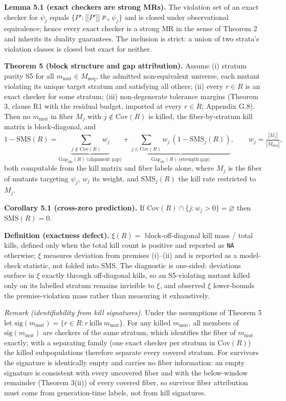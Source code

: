 \documentclass[manuscript,screen,review]{acmart}
\begin{document}
\textbf{Lemma 5.1 (exact checkers are strong MRs).} The violation set of
an exact checker for $\psi_j$ equals
$\{P' : \mathopen{\lbrack\!\lbrack} P' \mathclose{\rbrack\!\rbrack}\not\models_{\tau}\psi_j\}$
and is closed under observational equivalence; hence every exact checker
is a strong MR in the sense of Theorem 2 and inherits its duality
guarantees. The inclusion is strict: a union of two strata's violation
classes is closed but exact for neither.

\textbf{Theorem 5 (block structure and gap attribution).} Assume (i)
stratum purity S5 for all $m_{\mathrm{mut}}\in M_{\mathrm{neq}}$, the
admitted non-equivalent universe, each mutant violating its unique
target stratum and satisfying all others; (ii) every $r\in R$ is an
exact checker for some stratum; (iii) non-degenerate tolerance margins
(Theorem 3, clause R1 with the residual budget, imported at every
$r\in R$; Appendix G.8). Then no $m_{\mathrm{mut}}$ in fiber $M_j$ with
$j\notin \mathrm{Cov}(R)$ is killed, the fiber-by-stratum kill matrix is
block-diagonal, and
\[ 1-\mathrm{SMS}(R)=\underbrace{\textstyle\sum_{j\notin \mathrm{Cov}(R)} w_j}_{\mathrm{Gap}_{\mathrm{aln}}(R)\ \text{(alignment gap)}}
 +\underbrace{\textstyle\sum_{j\in \mathrm{Cov}(R)} w_j\,(1-\mathrm{SMS}_j(R))}_{\mathrm{Gap}_{\mathrm{str}}(R)\ \text{(strength gap)}},
 \qquad w_j=\tfrac{|M_j|}{|M_{\mathrm{neq}}|}, \]
both computable from the kill matrix and fiber labels alone, where
$M_j$ is the fiber of mutants targeting $\psi_j$, $w_j$ its weight, and
$\mathrm{SMS}_j(R)$ the kill rate restricted to $M_j$.

\textbf{Corollary 5.1 (cross-zero prediction).} If
$\mathrm{Cov}(R)\cap\{j:w_j>0\}=\varnothing$ then $\mathrm{SMS}(R)=0$.

\textbf{Definition (exactness defect).} $\xi(R)=$ block-off-diagonal
kill mass / total kills, defined only when the total kill count is
positive and reported as \texttt{NA} otherwise; $\xi$ measures deviation
from premises (i)--(ii) and is reported as a model-check statistic, not
folded into SMS. The diagnostic is one-sided: deviations surface in
$\xi$ exactly through off-diagonal kills, so an S5-violating mutant
killed only on its labelled stratum remains invisible to $\xi$, and
observed $\xi$ lower-bounds the premise-violation mass rather than
measuring it exhaustively.

\emph{Remark (identifiability from kill signatures).} Under the
assumptions of Theorem 5 let
$\mathrm{sig}(m_{\mathrm{mut}})=\{r\in R: r\ \text{kills}\ m_{\mathrm{mut}}\}$.
For any killed $m_{\mathrm{mut}}$, all members of
$\mathrm{sig}(m_{\mathrm{mut}})$ are checkers of the same stratum, which
identifies the fiber of $m_{\mathrm{mut}}$ exactly; with a separating
family (one exact checker per stratum in $\mathrm{Cov}(R)$) the killed
subpopulations therefore separate every covered stratum. For survivors
the signature is identically empty and carries no fiber information: an
empty signature is consistent with every uncovered fiber and with the
below-window remainder (Theorem 3(ii)) of every covered fiber, so
survivor fiber attribution must come from generation-time labels, not
from kill signatures.
\end{document}
